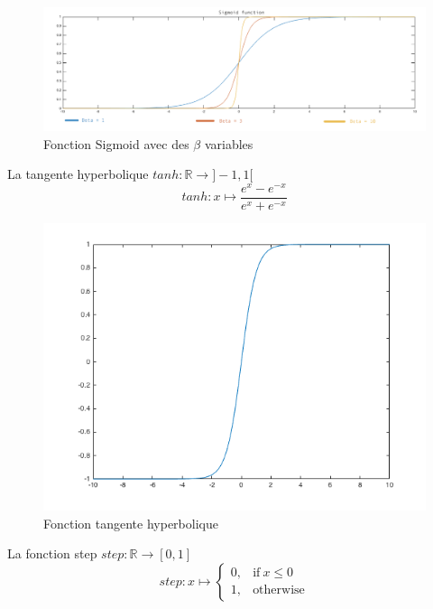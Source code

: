 \documentclass{article}
\begin{document}
\begin{figure}[h]
\begin{center}
	\includegraphics[scale=0.4]{sigmoid.png} 
	\caption{Fonction Sigmoid avec des $\beta$ variables}
\end{center}
\end{figure}

La tangente hyperbolique $tanh : \mathbb{R} \rightarrow ]-1, 1[$
\begin{equation}
	tanh : x \mapsto \frac{e^x - e^{-x}}{e^x + e^{-x}}
\end{equation}

\begin{figure}[h]
\begin{center}
	\includegraphics[scale=0.4]{tanh.png} 
	\caption{Fonction tangente hyperbolique}
\end{center}
\end{figure}

La fonction step $step : \mathbb{R} \rightarrow [0, 1]$
\begin{equation}
	step : x \mapsto
		\begin{cases}
			0, & \text{if}\ x \leq 0\\
			1, & \text{otherwise}
		\end{cases}
\end{equation}
\end{document}
